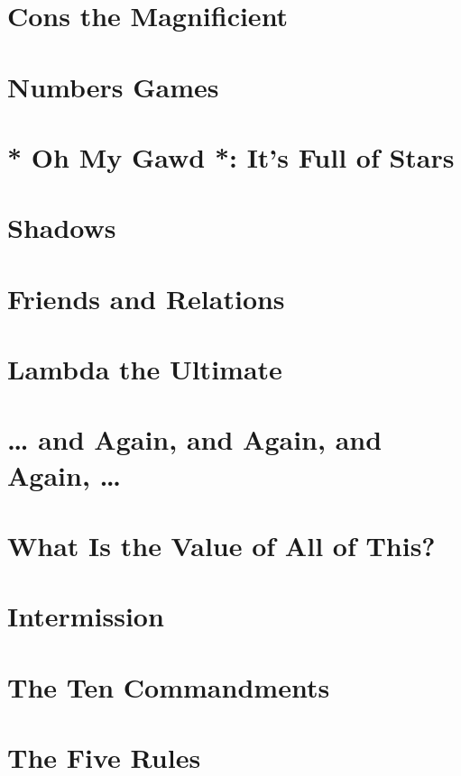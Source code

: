 \documentclass[11pt]{article}
\begin{document}
\section{Cons the Magnificient}
\label{sec:org4caf505}

\section{Numbers Games}
\label{sec:orga61731d}

\section{* Oh My Gawd *: It's Full of Stars}
\label{sec:orga1b1f07}

\section{Shadows}
\label{sec:orgd43c01f}

\section{Friends and Relations}
\label{sec:org2b90ab4}

\section{Lambda the Ultimate}
\label{sec:org4cc4db8}

\section{\ldots{} and Again, and Again, and Again, \ldots{}}
\label{sec:org1f63519}

\section{What Is the Value of All of This?}
\label{sec:org40eb81c}

\section{Intermission}
\label{sec:org263a4f1}

\section{The Ten Commandments}
\label{sec:org5507861}

\section{The Five Rules}
\label{sec:org1571c28}
\end{document}
